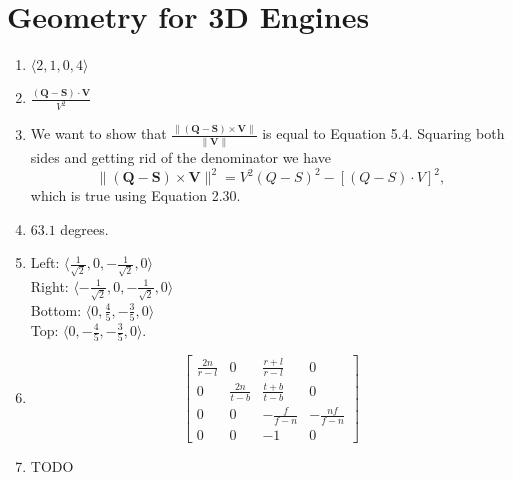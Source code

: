 \documentclass[a4paper]{report}
\begin{document}
\chapter{Geometry for 3D Engines}
\begin{enumerate}
	\item $\langle 2, 1, 0, 4 \rangle$
	\item $\frac{(\mathbf{Q} - \mathbf{S}) \cdot \mathbf{V}}{V^2}$
	\item We want to show that $\frac{\lVert (\mathbf{Q} - \mathbf{S}) \times \mathbf{V} \rVert}{\lVert \mathbf{V} \rVert}$
		is equal to Equation 5.4. Squaring both sides and getting rid of the denominator we have
		\begin{equation*}
			\lVert (\mathbf{Q} - \mathbf{S}) \times \mathbf{V} \rVert^2
			=
			V^2(Q - S)^2 - [(Q - S) \cdot V]^2,
		\end{equation*}
		which is true using Equation 2.30.
	\item $63.1$ degrees.
	\item
		Left: $\langle \frac{1}{\sqrt{2}}, 0, -\frac{1}{\sqrt{2}}, 0 \rangle$\\
		Right: $\langle -\frac{1}{\sqrt{2}}, 0, -\frac{1}{\sqrt{2}}, 0 \rangle$\\
		Bottom: $\langle 0, \frac{4}{5}, -\frac{3}{5}, 0 \rangle$\\
		Top: $\langle 0, -\frac{4}{5}, -\frac{3}{5}, 0 \rangle$.
	\item
		\begin{equation*}
			\left[
				\begin{matrix}
					\frac{2n}{r - l} & 0 & \frac{r + l}{r - l} & 0\\
					0 & \frac{2n}{t - b} & \frac{t + b}{t - b} & 0\\
					0 & 0 & -\frac{f}{f - n} & -\frac{nf}{f - n}\\
					0 & 0 & -1 & 0
				\end{matrix}
				\right]
		\end{equation*}
	\item TODO
\end{enumerate}
\end{document}
